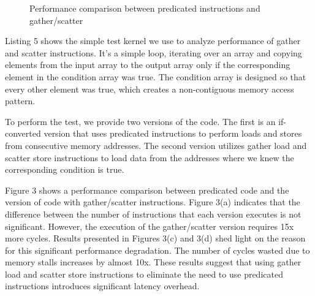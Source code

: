 \iffalse

\begin{figure*}[h]
\noindent\begin{minipage}{.45\textwidth}
\end{minipage}\hfill
\begin{minipage}{.45\textwidth}
\hfill
\end{minipage}
\noindent\begin{minipage}{.45\textwidth}
\hfill
\end{minipage}\hfill
\begin{minipage}{.45\textwidth}
\end{minipage}
 \caption{Performance comparison between predicated instructions and gather/scatter}
\end{figure*}

Listing 5 shows the simple test kernel we use to analyze performance of gather and scatter instructions. It's a simple loop, iterating over an array and copying elements from the input array to the output array only if the corresponding element in the condition array was true. The condition array is designed so that every other element was true, which creates a non-contiguous memory access pattern.

To perform the test, we provide two versions of the code. The first is an if-converted version that uses predicated instructions to perform loads and stores from consecutive memory addresses. 
The second version utilizes gather load and scatter store instructions to load data from the addresses where we knew the corresponding condition is true.


Figure 3 shows a performance comparison between predicated code and the version of code with gather/scatter instructions. 
Figure 3(a) indicates that the difference between the number of instructions that each version executes is not significant. 
However, the execution of the gather/scatter version requires 15x more cycles. 
Results presented in Figures 3(c) and 3(d) shed light on the reason for this significant performance degradation. The number of cycles wasted due to memory stalls increases by almost 10x. 
These results suggest that using gather load and scatter store instructions to eliminate the need to use predicated instructions introduces significant latency overhead.

